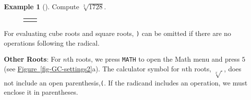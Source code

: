 \documentclass[10pt,]{book}
\newcommand{\terminology}[1]{\textbf{#1}}
\theoremstyle{plain}
\theoremstyle{definition}
\theoremstyle{definition}
\newtheorem{example}[theorem]{Example}
\theoremstyle{definition}
\numberwithin{equation}{part}
\newlength{\panelmax}
\begin{document}
%
\begin{example}[]\label{example-106}
Compute \(\sqrt[3]{1728} \).%
{%
\setlength{\panelmax}{0pt}
\newsavebox{\panelboxAJEp}
\newlength{\phAJEp}\setlength{\phAJEp}{\ht\panelboxAJEp+\dp\panelboxAJEp}
\settototalheight{\phAJEp}{\usebox{\panelboxAJEp}}
\setlength{\panelmax}{\maxof{\panelmax}{\phAJEp}}
\newsavebox{\panelboxAJFp}
\newlength{\phAJFp}\setlength{\phAJFp}{\ht\panelboxAJFp+\dp\panelboxAJFp}
\settototalheight{\phAJFp}{\usebox{\panelboxAJFp}}
\setlength{\panelmax}{\maxof{\panelmax}{\phAJFp}}
\leavevmode%
\setlength{\tabcolsep}{0.025\textwidth}
\begin{figure}
\begin{tabular}{@{}*{2}{c}@{}}
\begin{minipage}[c][\panelmax][t]{0.6\textwidth}\usebox{\panelboxAJEp}\end{minipage}&
\begin{minipage}[c][\panelmax][t]{0.35\textwidth}\usebox{\panelboxAJFp}\end{minipage}\end{tabular}
\end{figure}
}%
\end{example}
\par
For evaluating cube roots and square roots, \lstinline?)? can be omitted if there are no operations following the radical.%
\par
\terminology{Other Roots}: For \(n\)th roots, we press \lstinline?MATH? to open the Math menu and press \(5\) (see \hyperref[fig-GC-settings2]{Figure~\ref{fig-GC-settings2}}a). The calculator symbol for \(n\)th roots, \(\sqrt[x]{~} \), does not include an open parenthesis,\lstinline?(?. If the radicand includes an operation, we must enclose it in parentheses.%
\end{document}
